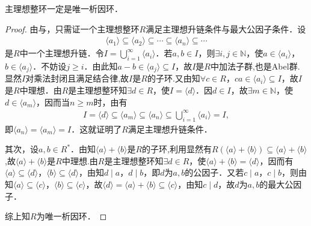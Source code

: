 \documentclass[../../main.tex]{subfiles}%
\begin{document}
\begin{theorem}\label{theorem:p.i.d必是UFD}
主理想整环一定是唯一析因环．
\end{theorem}
\begin{proof}

由与，只需证一个主理想整环$R$满足主理想升链条件与最大公因子条件．设
\begin{align*}
\langle a_1 \rangle \subseteq \langle a_2 \rangle \subseteq \cdots \subseteq \langle a_n \rangle \subseteq \cdots
\end{align*}
是$R$中一个主理想升链．令$I = \bigcup\limits_{i=1}^{\infty} \langle a_i \rangle$．若$a, b \in I$，则$\exists i, j \in \mathbb{N}$，使$a \in \langle a_i \rangle$，$b \in \langle a_j \rangle$．不妨设$j \geqslant i$．由此知$a - b \in \langle a_j \rangle \subseteq I$，故$I$是$R$中加法子群,也是Abel群.显然$I$对乘法封闭且满足结合律,故$I$是$R$的子环.又由知$\forall c \in R$，$ca \in \langle a_i \rangle \subseteq I$，故$I$是$R$中理想．由$R$是主理想整环知$\exists d \in R$，使$I = \langle d \rangle$．因$d \in I$，故$\exists m \in \mathbb{N}$，使$d \in \langle a_m \rangle$，因而当$n \geqslant m$时，由有
\begin{align*}
I = \langle d \rangle \subseteq \langle a_m \rangle \subseteq \langle a_n \rangle \subseteq \bigcup\limits_{i=1}^{\infty} \langle a_i \rangle = I,
\end{align*}
即$\langle a_n \rangle = \langle a_m \rangle = I$．这就证明了$R$满足主理想升链条件．

其次，设$a, b \in R^*$．由知$\langle a \rangle + \langle b \rangle$是$R$的子环,利用显然有$R(\langle a \rangle + \langle b \rangle)\subseteq \langle a \rangle + \langle b \rangle$,故$\langle a \rangle + \langle b \rangle$是$R$中理想.由$R$是主理想整环知$\exists d \in R$，使$\langle a \rangle + \langle b \rangle = \langle d \rangle$，因而有$\langle a \rangle \subseteq \langle d \rangle$，$\langle b \rangle \subseteq \langle d \rangle$，由知$d \mid a$，$d \mid b$，即$d$为$a, b$的公因子．又若$c \mid a$，$c \mid b$，则由知$\langle a \rangle \subseteq \langle c \rangle$，$\langle b \rangle \subseteq \langle c \rangle$，故$\langle d \rangle = \langle a \rangle + \langle b \rangle \subseteq \langle c \rangle$，由知$c \mid d$，故$d$为$a, b$的最大公因子．

综上知$R$为唯一析因环．

\end{proof}
\end{document}

